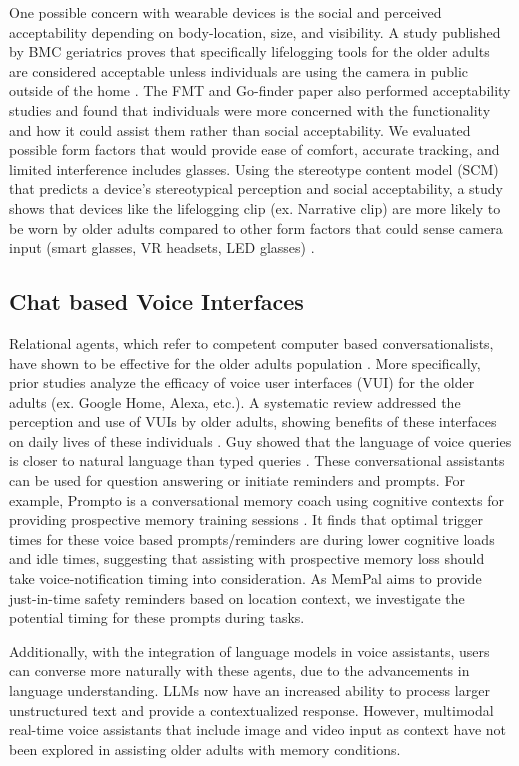 One possible concern with wearable devices is the social and perceived acceptability depending on body-location, size, and visibility. A study published by BMC geriatrics proves that specifically lifelogging tools for the older adults are considered acceptable unless individuals are using the camera in public outside of the home \cite{gelonch2019acceptability}. The FMT and Go-finder paper also performed acceptability studies and found that individuals were more concerned with the functionality and how it could assist them rather than social acceptability. We evaluated possible form factors that would provide ease of comfort, accurate tracking, and limited interference includes glasses. Using the stereotype content model (SCM) that predicts a device's stereotypical perception and social acceptability, a study shows that devices like the lifelogging clip (ex. Narrative clip) are more likely to be worn by older adults compared to other form factors that could sense camera input (smart glasses, VR headsets, LED glasses) \cite{schwind2020anticipated}.


\subsection{Chat based Voice Interfaces}

Relational agents, which refer to competent computer based conversationalists, have shown to be effective for the older adults population \cite{bickmore2005s}. More specifically, prior studies analyze the efficacy of voice user interfaces (VUI) for the older adults (ex. Google Home, Alexa, etc.). A systematic review addressed the perception and use of VUIs by older adults, showing benefits of these interfaces on daily lives of these individuals \cite{stigall2019older}. Guy showed that the language of voice queries is closer to natural language than typed queries \cite{guy2016searching}. These conversational assistants can be used for question answering or initiate reminders and prompts. For example, Prompto is a conversational memory coach using cognitive contexts for providing prospective memory training sessions \cite{chan2020prompto}. It finds that optimal trigger times for these voice based prompts/reminders are during lower cognitive loads and idle times, suggesting that assisting with prospective memory loss should take voice-notification timing into consideration. As MemPal aims to provide just-in-time safety reminders based on location context, we investigate the potential timing for these prompts during tasks. 

Additionally, with the integration of language models in voice assistants, users can converse more naturally with these agents, due to the advancements in language understanding. LLMs now have an increased ability to process larger unstructured text and provide a contextualized response. However, multimodal real-time voice assistants that include image and video input as context have not been explored in assisting older adults with memory conditions.

\fi